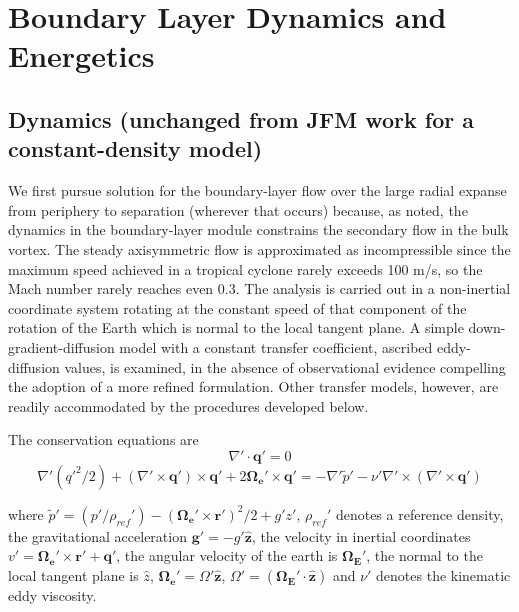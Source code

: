 \documentclass[preprint, prX]{revtex4}
\begin{document}
\section{Boundary Layer Dynamics and Energetics}

\subsection{Dynamics (unchanged from JFM work for a constant-density model)}

We first pursue solution for the boundary-layer flow over the large radial expanse from periphery to separation (wherever that occurs) because, as noted, the dynamics in the boundary-layer module constrains the secondary flow in the bulk vortex. The steady axisymmetric flow is approximated as incompressible since the maximum speed achieved in a tropical cyclone rarely exceeds 100 m/s, so the Mach number rarely reaches even 0.3. The analysis is carried out in a non-inertial coordinate system rotating at the constant speed of that component of the rotation of the Earth which is normal to the local tangent plane. A simple down-gradient-diffusion model with a constant transfer coefficient, ascribed eddy-diffusion values, is examined, in the absence of observational evidence compelling the adoption of a more refined formulation. Other transfer models, however, are readily accommodated by the procedures developed below.

The conservation equations are
\begin{equation}
\nabla' \cdot \mathbf{q'}=0
\end{equation}
\begin{equation}
\nabla'(q'^2/2) +(\nabla' \times \mathbf{q'})\times \mathbf{q'} + 2 \mathbf{\Omega_e'} \times \mathbf{q'}=-\nabla' \tilde{p}' - \nu' \nabla' \times (\nabla' \times \mathbf{q'})
\end{equation}

where $\tilde{p}' = (p'/\rho_{ref}') - (\mathbf{\Omega_e'} \times \mathbf{r'})^2/2 + g' z'$, $\rho_{ref}'$ denotes a reference density, the gravitational acceleration $\mathbf{g'} = −g' \hat{\mathbf{z}}$, the velocity in inertial coordinates $v' = \mathbf{\Omega_e'} \times \mathbf{r'} + \mathbf{q'}$,
the angular velocity of the earth is $\mathbf{\Omega_E'}$, the normal to the local tangent plane is $\hat{z}$, $\mathbf{\Omega_e'} = \Omega' \hat{\mathbf{z}}$, $\Omega'= (\mathbf{\Omega_E'} \cdot \hat{\mathbf{z}})$ and $\nu'$ denotes the kinematic eddy viscosity.
\end{document}
